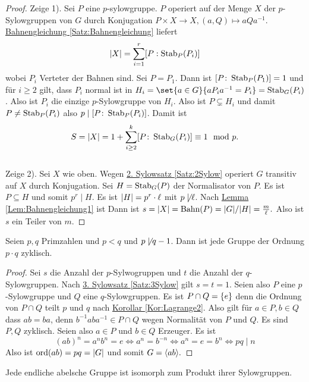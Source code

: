 \begin{proof}
    Zeige 1). Sei \(P\) eine \(p\)-sylowgruppe. \(P\) operiert auf der Menge \(X\) der \(p\)-Sylowgruppen von \(G\) durch Konjugation \(P\times X\to X, (a,Q)\mapsto aQa^{-1}\).
    \hyperref[Satz:Bahnengleichung]{Bahnengleichung \ref{Satz:Bahnengleichung}} liefert
    \[\lvert X\rvert=\sum_{i=1}^r[P:\operatorname{Stab}_P(P_i)]\] wobei \(P_i\) Verteter der Bahnen sind. Sei \(P=P_1\). Dann ist \([P\colon\operatorname{Stab}_P(P_1)]=1\) und für \(i\geq 2\) gilt, dass \(P_i\) normal ist in \(H_i=\set{a\in G}{aP_ia^{-1}=P_i}=\Stab_G(P_i)\). Also ist \(P_i\) die einzige \(p\)-Sylowgruppe von \(H_i\). Also ist \(P\subsetneq H_i\) und damit \(P\neq \operatorname{Stab}_P(P_i)\) also \(p\mid [P\colon\operatorname{Stab}_P(P_i)]\). Damit ist \[S=\lvert X\rvert=1+\sum_{i\geq 2}^k[P\colon \operatorname{Stab}_G(P_i)]\equiv 1\mod p.\]\\
    Zeige 2). Sei \(X\) wie oben. Wegen \hyperref[Satz:2Sylow]{2. Sylowsatz \ref{Satz:2Sylow}} operiert \(G\) transitiv auf \(X\) durch Konjugation.
    Sei \(H=\operatorname{Stab}_G(P)\) der Normalisator von \(P\). Es ist \(P\subseteq H\) und somit \(p^r\mid H\). Es ist \(\lvert H\rvert=p^r\cdot \ell\) mit \(p\not\mid \ell\). Nach \hyperref[Lem:Bahnengleichung1]{Lemma \ref{Lem:Bahnengleichung1}} ist
    Dann ist \(s=\lvert X\rvert=\text{Bahn}(P)=\lvert G\rvert/\lvert H\rvert=\frac{m}{\ell}.\) Also ist \(s\) ein Teiler von \(m\).
\end{proof}
\begin{Satz}
    Seien \(p,q\) Primzahlen und \(p<q\)  und \(p\not\mid q-1\). Dann ist jede Gruppe der Ordnung \(p\cdot q\) zyklisch.
\end{Satz}
\begin{proof}
    Sei \(s\) die Anzahl der \(p\)-Sylwogruppen und \(t\) die Anzahl der \(q\)-Sylowgruppen. Nach \hyperref[Satz:3Sylow]{3. Sylowsatz \ref{Satz:3Sylow}} gilt \(s=t=1.\) Seien also \(P\) eine \(p\)-Sylowgruppe und \(Q\) eine \(q\)-Sylowgruppen.
    Es ist \(P\cap Q=\{e\}\) denn die Ordnung von \(P\cap Q\) teilt \(p\) und \(q\) nach \hyperref[Kor:Lagrange2]{Korollar \ref{Kor:Lagrange2}}. Also gilt für \(a\in P, b\in Q\) dass \(ab=ba\), denn \(b^{-1}aba^{-1}\in P\cap Q\) wegen Normalität von \(P\) und \(Q\). Es sind \(P,Q\) zyklisch. Seien also \(a\in P\) und \(b\in Q\) Erzeuger. Es ist 
    \[(ab)^n=a^nb^n=e\iff a^n=b^{-n}\iff a^n=e=b^n\iff pq\mid n\]
    Also ist \(\operatorname{ord}(ab)=pq=\lvert G\rvert\) und somit \(G=\langle ab\rangle.\)
\end{proof}
\begin{Lemma}
    Jede endliche abelsche Gruppe ist isomorph zum Produkt ihrer Sylowgruppen.
\end{Lemma}
